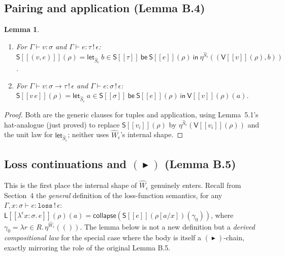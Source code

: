 \documentclass[11pt]{article}
\theoremstyle{plain}
\newtheorem{lemma}[theorem]{Lemma}
\newcommand{\Ssem}[1]{\mathsf{S}[\![#1]\!]}
\newcommand{\Lsem}[1]{\mathsf{L}[\![#1]\!]}
\newcommand{\Vsem}[1]{\mathsf{V}[\![#1]\!]}
\newcommand{\eps}{\epsilon}
\newcommand{\then}{\mathrel{\blacktriangleright}}
\newcommand{\collapse}{\mathsf{collapse}}
\begin{document}
\subsection{Pairing and application (Lemma B.4)}

\begin{lemma}\
\begin{enumerate}[label=(\arabic*)]
\item For $\Gamma\vdash v:\sigma$ and $\Gamma\vdash e:\tau\,!\,\eps$:
  $\Ssem{(v,e)}(\rho) = \mathsf{let}_{\widehat S_\eps}\ b\in\Ssem\tau\ \mathsf{be}\ \Ssem{e}(\rho)\ \mathsf{in}\ \eta^{\widehat S_\eps}((\Vsem{v}(\rho),b))$.
\item For $\Gamma\vdash v:\sigma\to\tau\,!\,\eps$ and $\Gamma\vdash e:\sigma\,!\,\eps$:
  $\Ssem{v\,e}(\rho) = \mathsf{let}_{\widehat S_\eps}\ a\in\Ssem\sigma\ \mathsf{be}\ \Ssem{e}(\rho)\ \mathsf{in}\ \Vsem{v}(\rho)(a)$.
\end{enumerate}
\end{lemma}
\begin{proof}
Both are the generic clauses for tuples and application, using Lemma~5.1's hat-analogue (just
proved) to replace $\Ssem{v_i}(\rho)$ by $\eta^{\widehat S_\eps}(\Vsem{v_i}(\rho))$ and the unit
law for $\mathsf{let}_{\widehat S_\eps}$; neither uses $\widehat W_\eps$'s internal shape.
\end{proof}

\subsection{Loss continuations and $(\then)$ (Lemma B.5)}

This is the first place the internal shape of $\widehat W_\eps$ genuinely enters. Recall from
Section~4 the \emph{general} definition of the loss-function semantics, for any
$\Gamma,x{:}\sigma\vdash e:\mathtt{loss}\,!\,\eps$:
$\Lsem{\lambda^\eps x{:}\sigma.\,e}(\rho)(a) = \collapse(\Ssem{e}(\rho[a/x])(\gamma_0))$, where
$\gamma_0 = \lambda r{\in}R.\,\eta^{\widehat W_\eps}(())$. The lemma below is not a new
definition but a \emph{derived compositional law} for the special case where the body is
itself a $(\then)$-chain, exactly mirroring the role of the original Lemma B.5.
\end{document}
